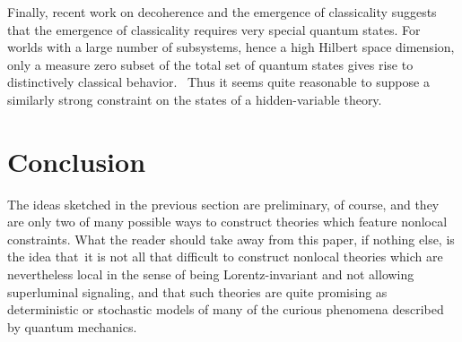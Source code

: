 \documentclass[12pt]{article}%
\begin{document}
Finally, recent work on decoherence and the emergence of classicality
\cite{SW08} suggests that the emergence of classicality requires very special
quantum states. For worlds with a large number of subsystems, hence a high
Hilbert space dimension, only a measure zero subset of the total set of
quantum states gives rise to distinctively classical behavior. \ Thus it seems
quite reasonable to suppose a similarly strong constraint on the states of a
hidden-variable theory.

\section{Conclusion}

The ideas sketched in the previous section are preliminary, of course, and
they are only two of many possible ways to construct theories which feature
nonlocal constraints. What the reader should take away from this paper, if
nothing else, is the idea that\ it is not all that difficult to construct
nonlocal theories which are nevertheless local in the sense of being
Lorentz-invariant and not allowing superluminal signaling, and that such
theories are quite promising as deterministic or stochastic models of many of
the curious phenomena described by quantum mechanics.
\end{document}
